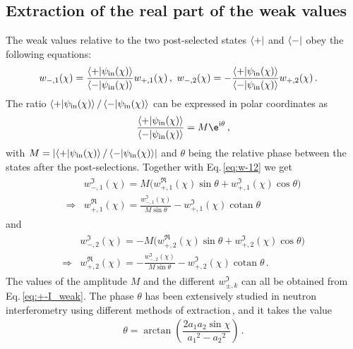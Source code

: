 \documentclass[12pt]{iopart}
\DeclareMathOperator{\cotan}{cotan}
\newcommand{\eq}{Eq.}
\newcommand{\I}{\mathrm{i}}
\begin{document}
\subsection{Extraction of the real part of the weak values}\label{subsec:real_part}
The weak values relative to the two post-selected states $\bra{+}$ and $\bra{-}$ obey the following equations:
\begin{align}
    w_{-,1}(\chi) &=  \frac{\braket{+|\psi_\mathrm{in}(\chi)}}{\braket{-|\psi_\mathrm{in}(\chi)}} w_{+,1}(\chi) \, , \ 
    w_{-,2}(\chi) = -\frac{\braket{+|\psi_\mathrm{in}(\chi)}}{\braket{-|\psi_\mathrm{in}(\chi)}} w_{+,2}(\chi) \label{eq:w-12}\, .
\end{align}
The ratio $\braket{+|\psi_\mathrm{in}(\chi)}/\braket{-|\psi_\mathrm{in}(\chi)}$ can be expressed in polar coordinates as
\begin{align}
    \frac{\braket{+|\psi_\mathrm{in}(\chi)}}{\braket{-|\psi_\mathrm{in}(\chi)}} = M \e^{\I \theta} \, ,
\end{align}
with $M=\left| \braket{+|\psi_\mathrm{in}(\chi)}/\braket{-|\psi_\mathrm{in}(\chi)}\right|$ and $\theta$ being the relative phase between the states after the post-selections. Together with \eq\,\eqref{eq:w-12} we get
\begin{align}
\begin{aligned}
    & w^\Im_{-,1}(\chi) = M\bigl(w^\Re_{+,1}(\chi)\sin \theta + w^\Im_{+,1}(\chi) \cos \theta\bigr) \\
    \Rightarrow & w^\Re_{+,1}(\chi) = \frac{w^\Im_{-,1}(\chi)}{M\sin \theta} - w^\Im_{+,1}(\chi) \cotan \theta
\end{aligned}\label{eq:real1}
\end{align}
and
\begin{align}
\begin{aligned}
    &w^\Im_{-,2}(\chi) = - M\bigl(w^\Re_{+,2}(\chi)\sin \theta + w^\Im_{+,2}(\chi) \cos \theta\bigr)\\
    \Rightarrow & w^\Re_{+,2}(\chi) = - \frac{w^\Im_{-,2}(\chi)}{M\sin \theta} - w^\Im_{+,2}(\chi) \cotan \theta \, . 
\end{aligned}\label{eq:real2}
\end{align}
The values of the amplitude $M$ and the different $w^\Im_{\pm,k}$ can all be obtained from \eq\,\eqref{eq:+-I_weak}. The phase $\theta$ has been extensively studied in neutron interferometry using different methods of extraction\,\cite{hasegawa1996,Wagh1998, filipp2005}, and it takes the value
\begin{align}
    \theta=\arctan\left(\dfrac{2a_1a_2 \sin\chi  }{{a_1}^2-{a_2}^2}\right)\, . \label{eq:theta}
\end{align}
\end{document}

